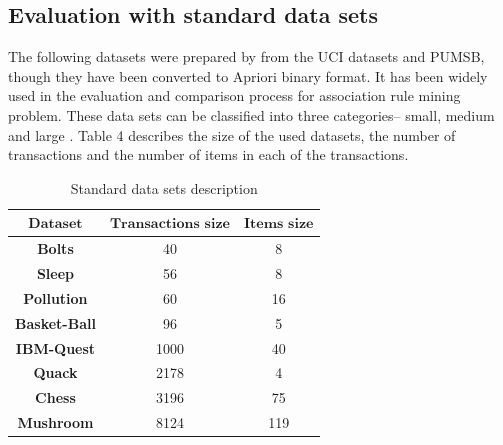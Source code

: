 \documentclass[preprint,12pt]{elsarticle}
\begin{document}
\subsection{Evaluation with standard data sets}
The following datasets were prepared by \cite{28} from the UCI datasets and PUMSB, 
though they have been converted to Apriori binary format. It has been widely used in 
the evaluation and comparison process for association rule mining problem. These data sets can be classified into three categories-- 
small, medium and large \cite{29}. Table 4 describes the size of the used datasets, the number of transactions and the number
of items in each of the transactions. 
\begin{table}[htbp]
\small
\label{datas}
\caption{Standard data sets description}
\begin{center}
\begin{tabular}{c c c}
\toprule
$\textbf{Dataset}$&$\textbf{Transactions size}$&$\textbf{Items size}$\\\hline
\textbf{Bolts}	&40	&8\\\hline
\textbf{Sleep}	&56	&8\\\hline
\textbf{Pollution}	&60	&16\\\hline
\textbf{Basket-Ball}	&96	&5	\\\hline
\textbf{IBM-Quest}	&1000	&40	\\\hline
\textbf{Quack}	&2178	&4	\\\hline
\textbf{Chess}	&3196	&75	\\\hline
\textbf{Mushroom}	&8124	&119 	\\\hline
\bottomrule
\end{tabular}
\end{center}
\end{table}
\end{document}

